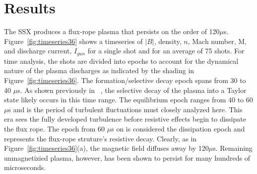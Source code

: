 \documentclass[12pt]{iopart}
\begin{document}
\section{Results}

The SSX produces a flux-rope plasma that persists on the order of 120$\mu$s. Figure~\ref{fig:timeseries36} shows a timeseries of $|B|$, density, $n$, Mach number, M, and discharge current, $I_{gun}$ for a single shot and for an average of 75 shots. For time analysis, the shots are divided into epochs to account for the dynamical nature of the plasma discharges as indicated by the shading in Figure~\ref{fig:timeseries36}. The formation/selective decay epoch spans from 30 to 40 $\mu$s. As shown previously in ~\cite{Gray13}, the selective decay of the plasma into a Taylor state likely occurs in this time range. The equilibrium epoch ranges from 40 to 60 $\mu$s and is the period of turbulent fluctuations must closely analyzed here. This era sees the fully developed turbulence before resistive effects begin to dissipate the flux rope. The epoch from 60 $\mu$s on is considered the dissipation epoch and represents the flux-rope struture's resistive decay. Clearly, as in Figure~\ref{fig:timeseries36}(a), the magnetic field diffuses away by 120$\mu$s. Remaining unmagnetizied plasma, however, has been shown to persist for many hundreds of microseconds.
\end{document}
